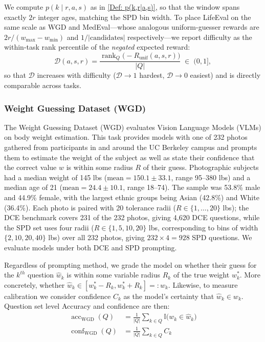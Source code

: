 \documentclass{article}
\begin{document}
We compute $p(k \mid r,a,s)$ as in \eqref{Def: p(k,r|a,s)}, so that the window spans exactly $2r$ integer ages, matching the SPD bin width. 
To place LifeEval on the same scale as WGD and MedEval---whose analogous uniform-guesser rewards are $2r/(w_{\max}-w_{\min})$ and $1/|\text{candidates}|$ respectively---we report difficulty as the within-task rank percentile of the \emph{negated} expected reward:
\begin{equation}
    \mathcal{D}(a,s,r)
    = \frac{\operatorname{rank}_{Q}\!\bigl(-R_{\text{unif}}(a,s,r)\bigr)}{|Q|}
    \;\in\; (0,1],
    \label{eq:le_difficulty}
\end{equation}
so that $\mathcal{D}$ increases with difficulty ($\mathcal{D}\to 1$ hardest, $\mathcal{D}\to 0$ easiest) and is directly comparable across tasks.


\subsubsection{Weight Guessing Dataset (WGD)}
\label{sec:wgd}

The Weight Guessing Dataset (WGD) evaluates Vision Language Models (VLMs) on body weight estimation. This task provides models with one of 232 photos gathered from participants in and around the UC Berkeley campus and prompts them to estimate the weight of the subject as well as state their confidence that the correct value $w$ is within some radius $R$ of their guess. Photographic subjects had a median weight of 145 lbs ($\text{mean} = 150.1 \pm 33.1$, range 95--380 lbs) and a median age of 21 ($\text{mean} = 24.4 \pm 10.1$, range 18--74). The sample was 53.8\% male and 44.9\% female, with the largest ethnic groups being Asian (42.8\%) and White (36.4\%). Each photo is paired with 20 tolerance radii ($R \in \{1, \ldots, 20\}$ lbs); the DCE benchmark covers 231 of the 232 photos, giving 4,620 DCE questions, while the SPD set uses four radii ($R \in \{1, 5, 10, 20\}$ lbs, corresponding to bins of width $\{2, 10, 20, 40\}$ lbs) over all 232 photos, giving $232 \times 4 = 928$ SPD questions. We evaluate models under both DCE and SPD prompting.

Regardless of prompting method, we grade the model on whether their guess for the $k^{th}$ question $\hat{w}_k$ is within some variable radius $R_k$ of the true weight $w^*_k$. More concretely, whether $\hat{w}_k \in [w^*_k - R_k, w^*_k + R_k] =: w_k$. Likewise, to measure calibration we consider confidence $C_k$ as the model's certainty that $\hat{w}_k \in w_k$. Question set level Accuracy and confidence are then:
\begin{align}
    \operatorname{acc}_{\text{WGD}}(Q) &= \frac{1}{|Q|}\sum_{k \in Q}\mathbb{I}\bigl(w_k \in \hat{w}_k\bigr) \\
    \operatorname{conf}_{\text{WGD}}(Q) &= \frac{1}{|Q|}\sum_{k \in Q} C_k
\end{align}
\end{document}
